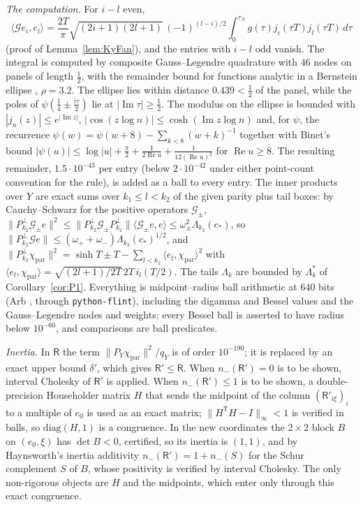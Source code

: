 \documentclass[11pt]{amsart}
\theoremstyle{definition}
\theoremstyle{remark}
\newcommand{\Rel}{\operatorname{Re}}
\newcommand{\Iml}{\operatorname{Im}}
\begin{document}
\emph{The computation.} For $i-l$ even,
\[
\langle\mathcal Ge_i,e_l\rangle=\frac{2T}\pi\sqrt{(2i+1)(2l+1)}\,(-1)^{(l-i)/2}\int_0^{\tau_N}g(\tau)j_i(\tau T)j_l(\tau T)\,d\tau
\]
(proof of Lemma~\ref{lem:KyFan}), and the entries with $i-l$ odd vanish. The integral is computed by composite
Gauss--Legendre quadrature with $46$ nodes on panels of length $\frac12$, with the remainder bound for
functions analytic in a Bernstein ellipse \cite[Thm.~19.3]{Trefethen2013}, $\rho=3.2$. The ellipse lies
within distance $0.439<\frac12$ of the panel, while the poles of $\psi(\frac14\pm\frac{i\tau}2)$ lie at
$|\Iml\tau|\ge\frac12$. The modulus on the ellipse is bounded with $|j_n(z)|\le e^{|\Iml z|}$,
$|\cos(z\log n)|\le\cosh(\Iml z\log n)$ and, for $\psi$, the recurrence $\psi(w)=\psi(w+8)-\sum_{k<8}(w+k)^{-1}$
together with Binet's bound $|\psi(u)|\le\log|u|+\frac\pi2+\frac1{2\Rel u}+\frac1{12(\Rel u)^2}$ for
$\Rel u\ge8$. The resulting remainder, $1.5\cdot10^{-43}$ per entry (below $2\cdot10^{-42}$ under either
point-count convention for the rule), is added as a ball to every entry. The inner products over $Y$ are
exact sums over $k_1\le l<k_2$ of the given parity plus tail boxes: by Cauchy--Schwarz for the positive
operators $\mathcal G_\pm$, $\|P^\perp_{k_2}\mathcal G_\pm e\|^2\le\|P^\perp_{k_2}\mathcal G_\pm P^\perp_{k_2}\|
\langle\mathcal G_\pm e,e\rangle\le\omega_\pm^2\Lambda_{k_2}(c_*)$, so
$\|P^\perp_{k_2}\mathcal Ge\|\le(\omega_++\omega_-)\Lambda_{k_2}(c_*)^{1/2}$, and
$\|P^\perp_{k_2}\chi_{\mathrm{par}}\|^2=\sinh T\pm T-\sum_{l<k_2}\langle e_l,\chi_{\mathrm{par}}\rangle^2$ with
$\langle e_l,\chi_{\mathrm{par}}\rangle=\sqrt{(2l+1)/2T}\,2T\,i_l(T/2)$. The tails $\Lambda_k$ are bounded by
$\Lambda^*_k$ of Corollary~\ref{cor:P1}. Everything is midpoint--radius ball arithmetic at $640$ bits
(Arb \cite{Johansson2017}, through \texttt{python-flint}), including the digamma and Bessel values and the
Gauss--Legendre nodes and weights; every Bessel ball is asserted to have radius below $10^{-60}$, and
comparisons are ball predicates.

\emph{Inertia.} In $\mathsf R$ the term $\|P_Y\chi_{\mathrm{par}}\|^2/q_Y$ is of order $10^{-190}$; it is replaced
by an exact upper bound $\delta'$, which gives $\mathsf R'\le\mathsf R$. When $n_-(\mathsf R')=0$ is to be shown,
interval Cholesky of $\mathsf R'$ is applied. When $n_-(\mathsf R')\le1$ is to be shown, a double-precision
Householder matrix $H$ that sends the midpoint of the column $(\mathsf R'_{i\xi})_i$ to a multiple of $e_0$ is
used as an exact matrix; $\|H^{\mathsf T}H-I\|_\infty<1$ is verified in balls, so $\mathrm{diag}(H,1)$ is a
congruence. In the new coordinates the $2\times2$ block $B$ on $(e_0,\xi)$ has $\det B<0$, certified, so its
inertia is $(1,1)$, and by Haynsworth's inertia additivity \cite{Haynsworth1968}
$n_-(\mathsf R')=1+n_-(S)$ for the Schur complement $S$ of $B$, whose positivity is verified by interval
Cholesky. The only non-rigorous objects are $H$ and the midpoints, which enter only through this exact
congruence.
\end{document}
